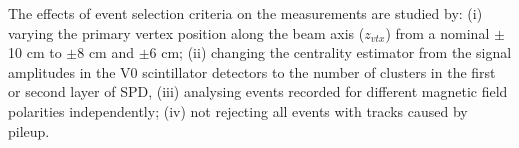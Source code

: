 \documentclass[ALICE,manyauthors]{cernphprep}
\begin{document}

The effects of event selection criteria on the measurements are studied by:  (i) varying the primary vertex position along the beam axis ($z_{vtx}$) from a nominal $\pm$10 cm to $\pm$8 cm and $\pm$6 cm; (ii) changing the centrality estimator from the signal amplitudes in the V0 scintillator detectors to the number of clusters in the first or second layer of SPD, (iii) analysing events recorded for different magnetic field polarities independently; (iv) not rejecting all events with tracks caused by pileup. 
\end{document}
